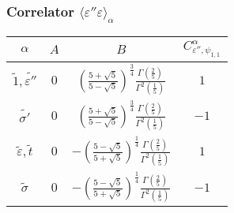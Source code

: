 \documentclass[a4paper,12pt]{report}
\begin{document}
\subsubsection{Correlator $\langle \varepsilon''\varepsilon\rangle_{\alpha}$}
\begin{center}
\begin{tabular}{|c|c|c|c|}\hline
$\alpha$ &  $A$  & $ B$ & $ C_{\varepsilon'',\psi_{1,1}}^{\alpha}$  \\
\hline

$\tilde{1}, \tilde{\varepsilon''}$ & $0$ & $\left(\frac{5+\sqrt{5}}{5-\sqrt{5}} \right)^{\frac{3}{4}}\frac{\Gamma \left(\frac{2}{5} \right)}{\Gamma ^{2}\left(\frac{1}{5} \right)}$ & $1$  \\

$\tilde{\sigma'}$ &  $0$ & $\left(\frac{5+\sqrt{5}}{5-\sqrt{5}} \right)^{\frac{3}{4}}\frac{\Gamma \left(\frac{2}{5} \right)}{\Gamma ^{2}\left(\frac{1}{5} \right)}$ & $-1$ \\

$\tilde{\varepsilon}, \tilde{t}$ & $0$ & $-\left(\frac{5-\sqrt{5}}{5+\sqrt{5}} \right)^{\frac{1}{4}}\frac{\Gamma \left(\frac{2}{5} \right)}{\Gamma ^{2}\left(\frac{1}{5} \right)}$& $1$  \\

$\tilde{\sigma}$ &  $0$ & $-\left(\frac{5-\sqrt{5}}{5+\sqrt{5}} \right)^{\frac{1}{4}}\frac{\Gamma
\left(\frac{2}{5} \right)}{\Gamma ^{2}\left(\frac{1}{5} \right)}$ & $-1$
\\ \hline
\end{tabular}
\end{center}
\end{document}
